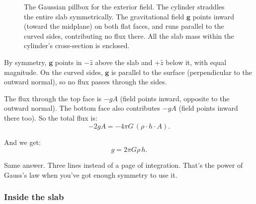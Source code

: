 \documentclass[11pt, letterpaper]{article}
\begin{document}
\begin{figure}[ht]
\caption{The Gaussian pillbox for the exterior field. The cylinder straddles the entire slab symmetrically. The gravitational field $\mathbf{g}$ points inward (toward the midplane) on both flat faces, and runs parallel to the curved sides, contributing no flux there. All the slab mass within the cylinder's cross-section is enclosed.}
\label{fig:pillbox}
\end{figure}

By symmetry, $\mathbf{g}$ points in $-\hat{z}$ above the slab and $+\hat{z}$ below it, with equal magnitude. On the curved sides, $\mathbf{g}$ is parallel to the surface (perpendicular to the outward normal), so no flux passes through the sides.

The flux through the top face is $-gA$ (field points inward, opposite to the outward normal). The bottom face also contributes $-gA$ (field points inward there too). So the total flux is:
\begin{equation}
  -2gA = -4\pi G\,(\rho \cdot h \cdot A).
\end{equation}

And we get:
\begin{equation}
  g = 2\pi G \rho\, h.
\end{equation}

Same answer. Three lines instead of a page of integration. That's the power of Gauss's law when you've got enough symmetry to use it.

\subsubsection{Inside the slab}
\end{document}
